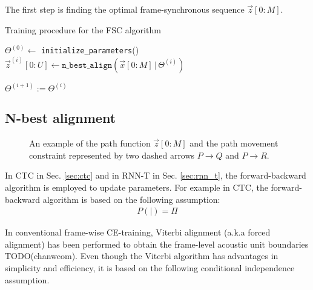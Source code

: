 \documentclass{article}
\begin{document}
The first step is finding the optimal frame-synchronous sequence
$\vec{z}[0:M]$.   


\begin{algorithm}
  \caption{Training procedure for the FSC algorithm}
  \label{algo:fsc_training}
  \begin{algorithmic}
    \State $\Theta^{(0)} \leftarrow$ \texttt{initialize\_parameters}()
        \State $ {\vec{z}^{(i)}}[0:U] 
          \leftarrow
          \texttt{n\_best\_align}
          \left(
            \vec{x}[0:M] \, \big|\, \Theta^{(i)}
          \right)$


    \EndFor
    \State $\Theta^{(i+1)} := \Theta^{(i)}$
  \EndFor
  \label{algorithm:fsc_training}
  \end{algorithmic}
\end{algorithm}



\subsection{N-best alignment}
\label{sec:n_best_alignment}


\begin{figure}
  \centering
    \resizebox{100mm}{!}{
      
    } 
    \caption {
      An example of the path function $\vec{z}[0:M]$ and the path movement 
      constraint represented by two dashed arrows 
      $P \rightarrow Q$ and $P \rightarrow R$.  \label{fig:path_alignment}
    }
  \label{fig:path_alignment}
\end{figure}

In CTC in Sec. \ref{sec:ctc} and in RNN-T in Sec. \ref{sec:rnn_t}, the 
forward-backward algorithm is employed to update parameters. 
For example in CTC, the forward-backward algorithm is based on the
following assumption:
\begin{align}
  P \left(  \Big| \right) = \Pi
\end{align}

In conventional frame-wise CE-training, Viterbi alignment 
(a.k.a forced alignment) has been performed to obtain the frame-level 
acoustic unit  boundaries TODO(chanwcom). Even though the Viterbi algorithm
has advantages in simplicity and efficiency, it is based on
the following conditional independence assumption.
\end{document}
